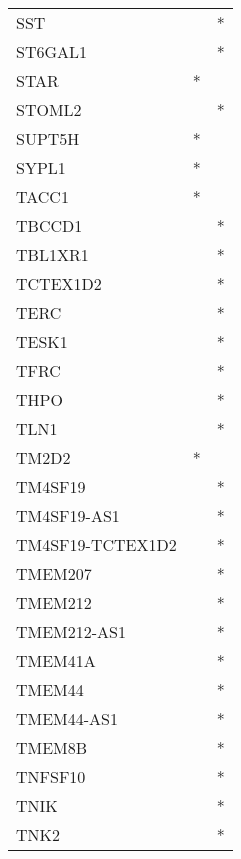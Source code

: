 \begin{longtable}{lcc}
SST              &                &          * \\
ST6GAL1          &                &          * \\
STAR             &              * &            \\
STOML2           &                &          * \\
SUPT5H           &              * &            \\
SYPL1            &              * &            \\
TACC1            &              * &            \\
TBCCD1           &                &          * \\
TBL1XR1          &                &          * \\
TCTEX1D2         &                &          * \\
TERC             &                &          * \\
TESK1            &                &          * \\
TFRC             &                &          * \\
THPO             &                &          * \\
TLN1             &                &          * \\
TM2D2            &              * &            \\
TM4SF19          &                &          * \\
TM4SF19-AS1      &                &          * \\
TM4SF19-TCTEX1D2 &                &          * \\
TMEM207          &                &          * \\
TMEM212          &                &          * \\
TMEM212-AS1      &                &          * \\
TMEM41A          &                &          * \\
TMEM44           &                &          * \\
TMEM44-AS1       &                &          * \\
TMEM8B           &                &          * \\
TNFSF10          &                &          * \\
TNIK             &                &          * \\
TNK2             &                &          * \\

\end{longtable}
